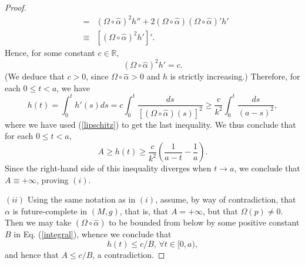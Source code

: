 \begin{proof}
\begin{eqnarray}
&=& (\Omega \circ \hat{\alpha})^2 h'' + 2(\Omega \circ \hat{\alpha})(\Omega \circ \hat{\alpha})'h' \\ \nonumber
&\equiv & [(\Omega \circ \hat{\alpha})^2 h']'.
\end{eqnarray}
Hence, for some constant $c \in \mathbb{R}$,
\begin{equation}
\label{relation}
(\Omega \circ \hat{\alpha})^2 h' = c.
\end{equation}
(We deduce that $c>0$, since $\Omega \circ \hat{\alpha} >0$ and $h$ is strictly increasing.) Therefore, for each $0\leq t <a$, we have
\begin{equation}
\label{integral}
h(t) = \int_0^t h'(s) ds = c \int_0^t \frac{ds}{[(\Omega \circ \hat{\alpha})(s)]^2} \geq \frac{c}{k^2} \int_0^t \frac{ds}{(a -s)^2},
\end{equation}
where we have used (\ref{lipschitz}) to get the last inequality. We thus conclude that for each $0\leq t <a$,
\[
A \geq h(t) \geq \frac{c}{k^2}\left( \frac{1}{a-t} - \frac{1}{a} \right).
\]
Since the right-hand side of this inequality diverges when $t \rightarrow a$, we conclude that $A \equiv +\infty$, proving $(i)$.

\smallskip

$(ii)$ Using the same notation as in $(i)$, assume, by way of contradiction, that $\alpha$ is future-complete in $(M,g)$, that is, that $A=+\infty$, but that $\Omega(p) \neq 0$. Then we may take $(\Omega \circ \hat{\alpha})$ to be bounded from below by some positive constant $B$ in Eq. (\ref{integral}), whence we conclude that
\[
h(t) \leq c/B, \, \forall t \in [0,a),
\]
and hence that $A \leq c/B$, a contradiction.

\smallskip


\end{proof}
